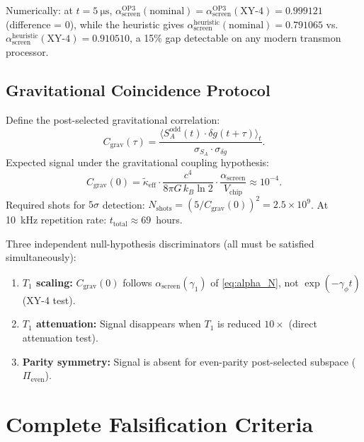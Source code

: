 \documentclass[12pt,a4paper]{article}
\theoremstyle{monette}
\theoremstyle{definition}
\newcommand{\SA}{S_A}
\newcommand{\asc}{\alpha_{\mathrm{screen}}}
\newcommand{\keff}{\tilde{\kappa}_{\mathrm{eff}}}
\newcommand{\gamone}{\gamma_1}
\newcommand{\gamphi}{\gamma_\phi}
\newcommand{\Tone}{T_1}
\begin{document}
Numerically: at $t = \SI{5}{\micro\second}$,
$\asc^{\mathrm{OP3}}(\text{nominal}) = \asc^{\mathrm{OP3}}(\text{XY-4}) = 0.999121$
(difference = 0), while the heuristic gives
$\asc^{\mathrm{heuristic}}(\text{nominal}) = 0.791065$ vs.\
$\asc^{\mathrm{heuristic}}(\text{XY-4}) = 0.910510$,
a 15\% gap detectable on any modern transmon processor.

\subsection{Gravitational Coincidence Protocol}
\label{sec:coincidence}

Define the post-selected gravitational correlation:
\begin{equation}
  C_{\mathrm{grav}}(\tau) =
    \frac{\bigl\langle \SA^{\mathrm{odd}}(t)\cdot\delta g(t+\tau)\bigr\rangle_t}
         {\sigma_{\SA}\cdot\sigma_{\delta g}}.
  \label{eq:Cgrav}
\end{equation}
Expected signal under the gravitational coupling hypothesis:
\begin{equation}
  C_{\mathrm{grav}}(0) = \keff\cdot\frac{c^4}{8\pi G\,k_B\ln 2}
    \cdot\frac{\asc}{V_{\mathrm{chip}}} \approx 10^{-4}.
  \label{eq:Cgrav_expected}
\end{equation}
Required shots for $5\sigma$ detection:
$N_{\mathrm{shots}} = (5/C_{\mathrm{grav}}(0))^2 = 2.5\times 10^9$.
At \SI{10}{\kilo\hertz} repetition rate: $t_{\mathrm{total}} \approx 69$~hours.

Three independent null-hypothesis discriminators (all must be satisfied simultaneously):
\begin{enumerate}
  \item \textbf{$T_1$ scaling:} $C_{\mathrm{grav}}(0)$ follows $\asc(\gamone)$
        of \cref{eq:alpha_N}, not $\exp(-\gamphi t)$ (XY-4 test).
  \item \textbf{$T_1$ attenuation:} Signal disappears when $\Tone$ is reduced
        $10\times$ (direct attenuation test).
  \item \textbf{Parity symmetry:} Signal is absent for even-parity
        post-selected subspace ($\Pi_{\mathrm{even}}$).
\end{enumerate}

\section{Complete Falsification Criteria}
\label{sec:falsification}
\end{document}
